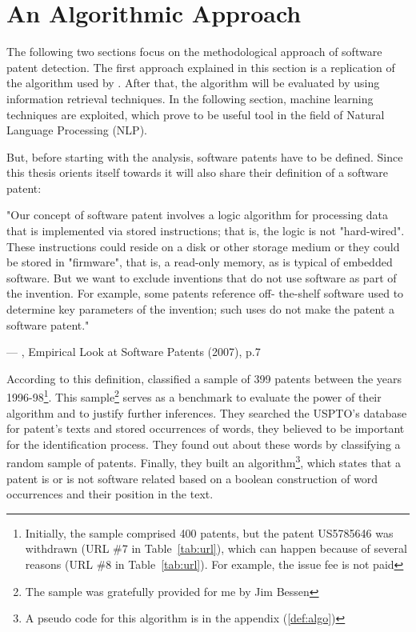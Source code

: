 \documentclass[12pt, a4paper, abstract, parskip]{scrartcl}
\theoremstyle{definition}
\begin{document}
\section{An Algorithmic Approach} %
\label{sub:an_algorithmic_approach}

The following two sections focus on the methodological approach of software
patent detection. The first approach explained in this section is a replication
of the algorithm used by \cite{bessen2007empirical}. After that, the algorithm
will be evaluated by using information retrieval techniques. In the following
section, machine learning techniques are exploited, which prove to be useful
tool in the field of Natural Language Processing (NLP).

But, before starting with the analysis, software patents have to be defined.
Since this thesis orients itself towards \cite{bessen2007empirical} it will
also share their definition of a software patent:

\epigraph{"Our concept of software patent involves a logic algorithm for
processing data that is implemented via stored instructions; that is, the logic
is not "hard-wired". These instructions could reside on a disk or other storage
medium or they could be stored in "firmware", that is, a read-only memory, as
is typical of embedded software. But we want to exclude inventions that do not
use software as part of the invention. For example, some patents reference off-
the-shelf software used to determine key parameters of the invention; such uses
do not make the patent a software patent."}{---
\textup{\citeauthor{bessen2007empirical}}, Empirical Look at Software Patents
(2007), p.7}

According to this definition, \citet[p.8]{bessen2007empirical} classified a
sample of 399 patents between the years 1996-98\footnote{Initially, the sample
comprised 400 patents, but the patent US5785646 was withdrawn (URL \#7 in
Table~\ref{tab:url}), which can happen because of several reasons (URL \#8 in
Table~\ref{tab:url}). For example, the issue fee is not paid}. This
sample\footnote{The sample was gratefully provided for me by Jim Bessen} serves
as a benchmark to evaluate the power of their algorithm and to justify further
inferences. They searched the USPTO's database for patent's texts and stored
occurrences of words, they believed to be important for the identification
process. They found out about these words by classifying a random sample of
patents. Finally, they built an algorithm\footnote{A pseudo code for this
algorithm is in the appendix (\ref{def:algo})}, which states that a patent is
or is not software related based on a boolean construction of word occurrences
and their position in the text.
\end{document}
